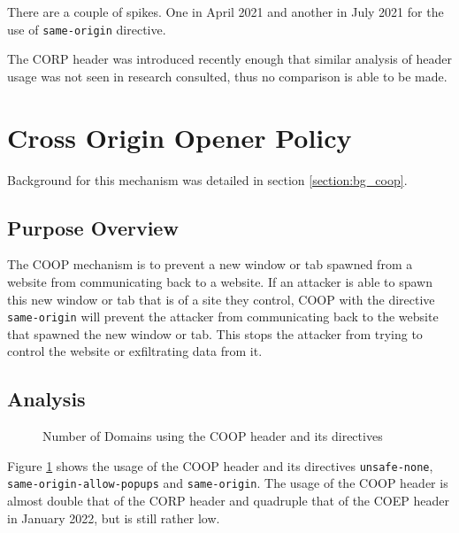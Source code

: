 \documentclass{mscreport}
\begin{document}
\vspace{0.3cm} \noindent
There are a couple of spikes. One in April 2021 and another in July 2021 for the use of \texttt{same-origin} directive.

\vspace{0.3cm} \noindent
The CORP header was introduced recently enough that similar analysis of header usage was not seen in research consulted, thus no comparison is able to be made.

\clearpage
\newpage


\section{Cross Origin Opener Policy}
\label{section:ana_coop}

Background for this mechanism was detailed in section \ref{section:bg_coop}.

\subsection{Purpose Overview}

\noindent
The COOP mechanism is to prevent a new window or tab spawned from a website from communicating back to a website. If an attacker is able to spawn this new window or tab that is of a site they control, COOP with the directive \texttt{same-origin} will prevent the attacker from communicating back to the website that spawned the new window or tab. This stops the attacker from trying to control the website or exfiltrating data from it.

\clearpage
\newpage

\subsection{Analysis}

\begin{figure}[t]
	\begin{center}
		\caption{Number of Domains using the COOP header and its directives}
		\label{fig:coop_overview}
	\end{center}
\end{figure}

\noindent
Figure \ref{fig:coop_overview} shows the usage of the COOP header and its directives \texttt{unsafe-none}, \newline \texttt{same-origin-allow-popups} and \texttt{same-origin}. The usage of the COOP header is almost double that of the CORP header and quadruple that of the COEP header in January 2022, but is still rather low.
\end{document}
